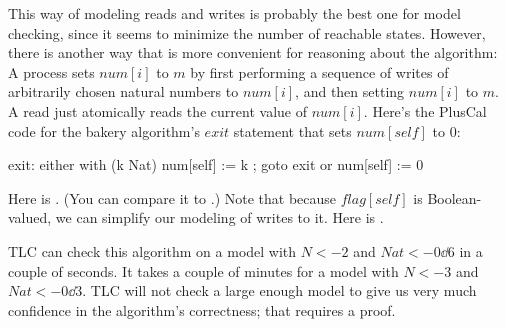 \documentclass[fleqn,leqno]{article}
\begin{document}
This way of modeling reads and writes is probably the best one for
model checking, since it seems to minimize the number of reachable
states.  However, there is another way that is more convenient for
reasoning about the algorithm: A process sets $num[i]$ to $m$ by first
performing a sequence of writes of arbitrarily chosen natural numbers
to $num[i]$, and then setting $num[i]$ to $m$.  A read just atomically
reads the current value of $num[i]$.  Here's the PlusCal code for the
bakery algorithm's $exit$ statement that sets $num[self]$ to $0$:
\begin{display}
\begin{nopcal}
exit: either {  with (k \in Nat) { num[self] := k } ;
                goto exit }
      or     { num[self] := 0 }
\end{nopcal}
\begin{tlatex}
%
\end{tlatex}
\end{display}
Here is .  (You can compare it to
.)  Note that because
$flag[self]$ is Boolean-valued, we can simplify our modeling of writes
to it.  Here is .  

TLC can check this algorithm on a model with $N<-2$ and $Nat <- 0\dd6$
in a couple of seconds.  It takes a couple of minutes for a model
with $N<-3$ and $Nat <- 0\dd3$.  TLC will not check a large enough model
to give us very much confidence in the algorithm's correctness; that
requires a proof.
\end{document}
